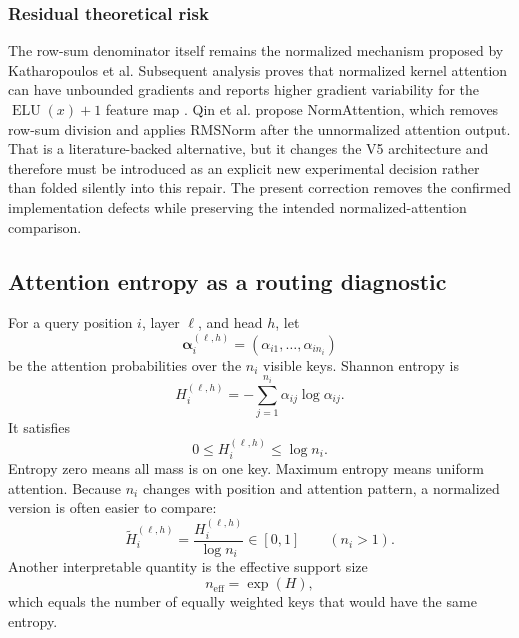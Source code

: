 \documentclass[11pt,a4paper]{article}
\theoremstyle{definition}
\theoremstyle{plain}
\DeclareMathOperator{\ELU}{ELU}
\begin{document}
\subsubsection{Residual theoretical risk}

The row-sum denominator itself remains the normalized mechanism proposed by Katharopoulos et al. Subsequent analysis proves that normalized kernel attention can have unbounded gradients and reports higher gradient variability for the $\ELU(x)+1$ feature map \cite{qin2022devil}. Qin et al. propose NormAttention, which removes row-sum division and applies RMSNorm after the unnormalized attention output. That is a literature-backed alternative, but it changes the V5 architecture and therefore must be introduced as an explicit new experimental decision rather than folded silently into this repair. The present correction removes the confirmed implementation defects while preserving the intended normalized-attention comparison.

\subsection{Attention entropy as a routing diagnostic}
\label{sec:attention-entropy}

For a query position $i$, layer $\ell$, and head $h$, let
\begin{equation}
    \bm\alpha_i^{(\ell,h)}
    =(\alpha_{i1},\ldots,\alpha_{in_i})
\end{equation}
be the attention probabilities over the $n_i$ visible keys. Shannon entropy is
\begin{equation}\label{eq:attention-entropy}
    H_i^{(\ell,h)}
    =-\sum_{j=1}^{n_i}\alpha_{ij}\log\alpha_{ij}.
\end{equation}
It satisfies
\begin{equation}
    0\leq H_i^{(\ell,h)}\leq\log n_i.
\end{equation}
Entropy zero means all mass is on one key. Maximum entropy means uniform attention. Because $n_i$ changes with position and attention pattern, a normalized version is often easier to compare:
\begin{equation}
    \widetilde H_i^{(\ell,h)}
    =\frac{H_i^{(\ell,h)}}{\log n_i}
    \in[0,1]
    \qquad (n_i>1).
\end{equation}
Another interpretable quantity is the effective support size
\begin{equation}
    n_{\mathrm{eff}}=\exp(H),
\end{equation}
which equals the number of equally weighted keys that would have the same entropy.
\end{document}
